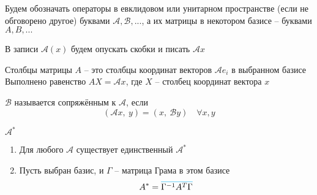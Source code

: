 \begin{notation}
	Будем обозначать операторы в евклидовом или унитарном пространстве (если не обговорено другое) буквами $ \mathcal{A}, \mathcal{B}, ... $, а их матрицы в некотором базисе -- буквами $ A, B, ... $
\end{notation}

\begin{notation}
	В записи $ \mathcal{A}(x) $ будем опускать скобки и писать $ \mathcal{A}x $
\end{notation}

\begin{remind}
	Столбцы матрицы $ A $ -- это столбцы координат векторов $ \mathcal{A}e_i $ в выбранном базисе \\
	Выполнено равенство $ AX = \mathcal{A}x $, где $ X $ -- столбец координат вектора $ x $
\end{remind}

\begin{definition}
	$ \mathcal{B} $ называется сопряжённым к $ \mathcal{A} $, если
	$$ (\mathcal{A}x, ~ y) = (x, ~ \mathcal{B}y) \quad \forall x, y $$
\end{definition}

\begin{notation}
	$ \mathcal{A}^* $
\end{notation}

\begin{theorem}
	\hfill
	\begin{enumerate}
		\item Для любого $ \mathcal{A} $ существует единственный $ \mathcal{A}^* $
		\item\label{en:452} Пусть выбран базис, и $ \Gamma $ -- матрица Грама в этом базисе
		$$ A^* = \color{cyan}\overline{\color{black}\Gamma^{-1}A^T\Gamma} $$
	\end{enumerate}
\end{theorem}

